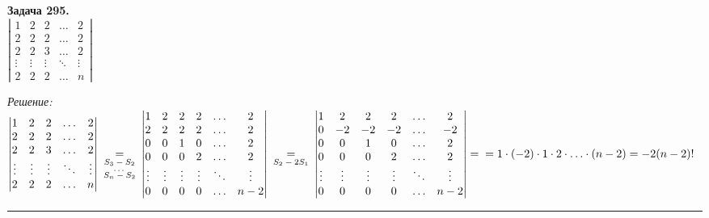 \documentclass[a4paper, 12pt]{article}
\newenvironment{problem}[2][Задача]
{ \begin{mdframed}[backgroundcolor=gray!10] \textbf{#1 #2.} \\}
	{  \end{mdframed}}
\newenvironment{solution}
{\textit{Решение:}\vspace{.1cm}\\}
{\vspace{.1cm}\noindent\rule{7in}{1.5pt}}
\begin{document}
\begin{problem}{295}
$\left| \begin{array}{rrrrr}1 & 2 & 2 & \ldots & 2\\ 2 & 2 & 2 & \ldots & 2 \\ 2 & 2 & 3 & \ldots & 2 \\ \vdots & \vdots & \vdots & \ddots & \vdots \\ 2 & 2 & 2 & \ldots & n \end{array} \right|$
\end{problem}
\newpage
\begin{solution}
$
\begin{vmatrix}
	1 & 2 & 2 & \ldots & 2\\ 
	2 & 2 & 2 & \ldots & 2 \\ 
	2 & 2 & 3 & \ldots & 2 \\ 
	\vdots & \vdots & \vdots & \ddots & \vdots \\ 
	2 & 2 & 2 & \ldots & n
\end{vmatrix} \:
\underset{\begin{subarray}{c}\text{$S_3-S_2$}\\
	\text{\ldots}\\\text{$S_n-S_2$}\end{subarray}}{=} \:
\begin{vmatrix}
	1 & 2 & 2 & 2 & \ldots & 2 \\ 
	2 & 2 & 2 & 2 & \ldots & 2 \\
	0 & 0 & 1 & 0 & \ldots & 2 \\
	0 & 0 & 0 & 2 & \ldots & 2 \\
	\vdots & \vdots & \vdots & \vdots & \ddots & \vdots \\
	0 & 0 & 0 & 0 & \ldots & n-2\\
\end{vmatrix} \:
\underset{\begin{subarray}{c}\text{$S_2-2S_1$}\end{subarray}}{=} \:
\begin{vmatrix}
	1 & 2 & 2 & 2 & \ldots & 2 \\ 
	0 & -2 & -2 & -2 & \ldots & -2 \\
	0 & 0 & 1 & 0 & \ldots & 2 \\
	0 & 0 & 0 & 2 & \ldots & 2 \\
	\vdots & \vdots & \vdots & \vdots & \ddots & \vdots \\
	0 & 0 & 0 & 0 & \ldots & n-2\\
\end{vmatrix} =\\= 1 \cdot (-2) \cdot 1 \cdot 2 \cdot \ldots \cdot (n-2) = -2(n-2)!
$\\

\end{solution} 
\end{document}
